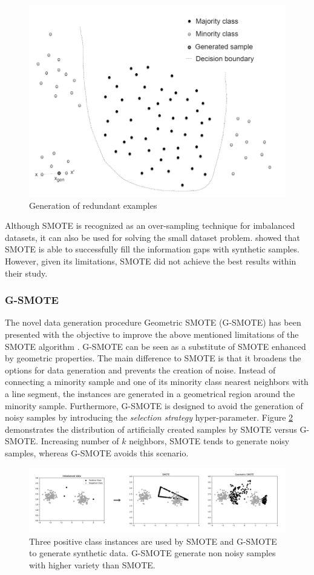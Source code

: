 \documentclass[parskip=full]{scrartcl}
\begin{document}
\begin{figure}[H]
	\centering
	\includegraphics[width=0.6\linewidth]{../analysis/redundant_examples.png}
	\caption{Generation of redundant examples \cite{Douzas.2019}}
	\label{fig:redundant-examples}
\end{figure}

Although SMOTE is recognized as an over-sampling technique for imbalanced
datasets, it can also be used for solving the small dataset problem.
\cite{Li.2018} showed that SMOTE is able to successfully fill the information
gaps with synthetic samples. However, given its limitations, SMOTE did not
achieve the best results within their study.

\subsubsection{G-SMOTE}

The novel data generation procedure Geometric SMOTE (G-SMOTE) has been presented
with the objective to improve the above mentioned limitations of the SMOTE
algorithm \cite{Douzas.2019}. G-SMOTE can be seen as a substitute of SMOTE
enhanced by geometric properties. The main difference to SMOTE is that it
broadens the options for data generation and prevents the creation of noise.
Instead of connecting a minority sample and one of its minority class nearest
neighbors with a line segment, the instances are generated in a geometrical
region around the minority sample. Furthermore, G-SMOTE is designed to avoid the
generation of noisy samples by introducing the \textit{selection strategy}
hyper-parameter. Figure \ref{fig:smotevsgsmote} demonstrates the distribution of
artificially created samples by SMOTE versus G-SMOTE. Increasing number of
$\mathit{k}$ neighbors, SMOTE tends to generate noisy samples, whereas G-SMOTE
avoids this scenario.

\begin{figure}[H]
	\centering
	\includegraphics[width=1\linewidth]{../analysis/smote_vs_gsmote}
	\caption{Three positive class instances are used by SMOTE and G-SMOTE to generate synthetic data. 
	G-SMOTE generate non noisy samples with higher variety than SMOTE. \cite{Douzas.2019}}
	\label{fig:smotevsgsmote}
\end{figure}
\end{document}
